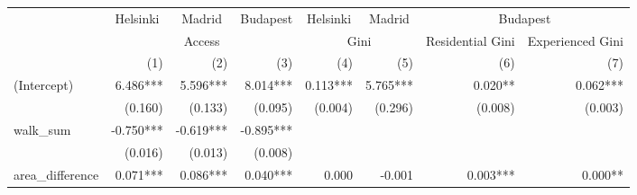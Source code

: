 \begin{tabular}{lrrrrrrr}
\toprule
                      & \multicolumn{1}{c}{Helsinki} & \multicolumn{1}{c}{Madrid} & \multicolumn{1}{c}{Budapest} & \multicolumn{1}{c}{Helsinki} & \multicolumn{1}{c}{Madrid} &                         \multicolumn{2}{c}{Budapest}                        \\ 
\cmidrule(lr){2-2} \cmidrule(lr){3-3} \cmidrule(lr){4-4} \cmidrule(lr){5-5} \cmidrule(lr){6-6} \cmidrule(lr){7-8} 
                      &                                \multicolumn{3}{c}{Access}                                &                  \multicolumn{2}{c}{Gini}                 & \multicolumn{1}{c}{Residential Gini} & \multicolumn{1}{c}{Experienced Gini} \\ 
\cmidrule(lr){2-4} \cmidrule(lr){5-6} \cmidrule(lr){7-7} \cmidrule(lr){8-8} 
                      &                          (1) &                        (2) &                          (3) &                          (4) &                        (5) &                                  (6) &                                  (7) \\ 
\midrule
(Intercept)           &                     6.486*** &                   5.596*** &                     8.014*** &                     0.113*** &                   5.765*** &                              0.020** &                             0.062*** \\ 
                      &                      (0.160) &                    (0.133) &                      (0.095) &                      (0.004) &                    (0.296) &                              (0.008) &                              (0.003) \\ 
walk\_sum             &                    -0.750*** &                  -0.619*** &                    -0.895*** &                              &                            &                                      &                                      \\ 
                      &                      (0.016) &                    (0.013) &                      (0.008) &                              &                            &                                      &                                      \\ 
area\_difference      &                     0.071*** &                   0.086*** &                     0.040*** &                        0.000 &                     -0.001 &                             0.003*** &                              0.000** \\ 

\end{tabular}
